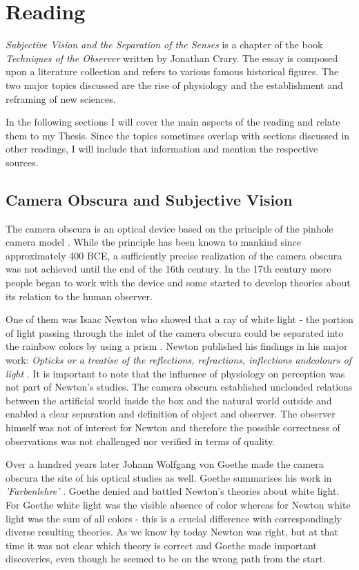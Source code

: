 \documentclass[12pt,a4paper]{article}
\begin{document}
\section*{Reading}

{\it{Subjective Vision and the Separation of the Senses}} is a chapter of the book {\it{Techniques of the
Observer}} \cite{crary} written by Jonathan Crary. The essay is composed upon a literature collection and
refers to various famous historical figures. The two major topics discussed are the rise of physiology and
the establishment and reframing of new sciences.

In the following sections I will cover the main aspects of the reading and relate them to my Thesis.
Since the topics sometimes overlap with sections discussed in other readings, I will include that
information and mention the respective sources.

\subsection*{Camera Obscura and Subjective Vision}

The camera obscura is an optical device based on the principle of the pinhole camera model \cite{camera}. While
the principle has been known to mankind since approximately 400 BCE, a sufficiently precise realization of the
camera obscura was not achieved until the end of the 16th century. In the 17th century more people began to
work with the device and some started to develop theories about its relation to the human observer.

One of them was Isaac Newton who showed that a ray of white light - the portion of light passing through the
inlet of the camera obscura could be separated into the rainbow colors by using a prism \cite{newtongoethe}.
Newton published his findings in his major work: {\it{Opticks or a treatise of the reflections, refractions,
inflections andcolours of light}} \cite{opticks}.
It is important to note that the influence of physiology on perception
was not part of Newton's studies. The camera obscura established unclouded relations between
the artificial world inside the box and the natural world outside and enabled a clear separation
and definition of object and observer. The observer himself was not of interest for Newton and therefore the
possible correctness of observations was not challenged nor verified in terms of quality.

Over a hundred years later Johann Wolfgang von Goethe made the camera obscura the site of his optical studies
as well. Goethe summarises his work in {\it{'Farbenlehre'}} \cite{farbenlehre}. 
Goethe denied and battled Newton's theories about white light. For Goethe white light was the visible
absence of color whereas for Newton white light was the sum of all colors - this is a crucial difference
with correspondingly diverse resulting theories. As we know by today Newton was right, but at that time it
was not clear which theory is correct and Goethe made important discoveries, even though he seemed to be on
the wrong path from the start.
\end{document}
